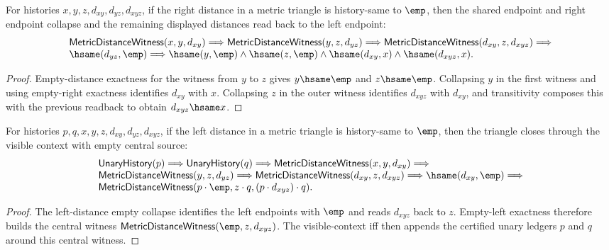 \begin{theorem}
\label{thm:metric-distance-witness-triangle-right-distance-empty-collapse}
For histories $x,y,z,d_{xy},d_{yz},d_{xyz}$, if the right distance in a
metric triangle is history-same to $\emp$, then the shared endpoint and right
endpoint collapse and the remaining displayed distances read back to the left
endpoint:
$$
\begin{array}{l}
\mathsf{MetricDistanceWitness}(x,y,d_{xy})\Longrightarrow
\mathsf{MetricDistanceWitness}(y,z,d_{yz})\Longrightarrow
\mathsf{MetricDistanceWitness}(d_{xy},z,d_{xyz})\Longrightarrow\\
\hsame(d_{yz},\emp)\Longrightarrow
\hsame(y,\emp)\land\hsame(z,\emp)\land
\hsame(d_{xy},x)\land\hsame(d_{xyz},x).
\end{array}
$$
\end{theorem}
\begin{proof}
Empty-distance exactness for the witness from $y$ to $z$ gives
$y\hsame\emp$ and $z\hsame\emp$. Collapsing $y$ in the first witness and using
empty-right exactness identifies $d_{xy}$ with $x$. Collapsing $z$ in the outer
witness identifies $d_{xyz}$ with $d_{xy}$, and transitivity composes this with
the previous readback to obtain $d_{xyz}\hsame x$.
\end{proof}

\begin{theorem}
\label{thm:metric-distance-witness-triangle-left-distance-empty-visible-context-closed}
For histories $p,q,x,y,z,d_{xy},d_{yz},d_{xyz}$, if the left distance in a
metric triangle is history-same to $\emp$, then the triangle closes through
the visible context with empty central source:
$$
\begin{array}{l}
\mathsf{UnaryHistory}(p)\Longrightarrow\mathsf{UnaryHistory}(q)\Longrightarrow
\mathsf{MetricDistanceWitness}(x,y,d_{xy})\Longrightarrow\\
\mathsf{MetricDistanceWitness}(y,z,d_{yz})\Longrightarrow
\mathsf{MetricDistanceWitness}(d_{xy},z,d_{xyz})\Longrightarrow
\hsame(d_{xy},\emp)\Longrightarrow\\
\mathsf{MetricDistanceWitness}(p\cdot\emp,z\cdot q,(p\cdot d_{xyz})\cdot q).
\end{array}
$$
\end{theorem}
\begin{proof}
The left-distance empty collapse identifies the left endpoints with $\emp$ and
reads $d_{xyz}$ back to $z$. Empty-left exactness therefore builds the central
witness $\mathsf{MetricDistanceWitness}(\emp,z,d_{xyz})$. The visible-context
iff then appends the certified unary ledgers $p$ and $q$ around this central
witness.
\end{proof}

